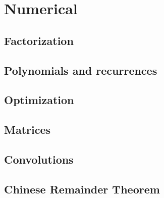 \chapter{Numerical}

\section{Factorization}

\section{Polynomials and recurrences}

\section{Optimization}

\section{Matrices}

\section{Convolutions}

\section{Chinese Remainder Theorem}
